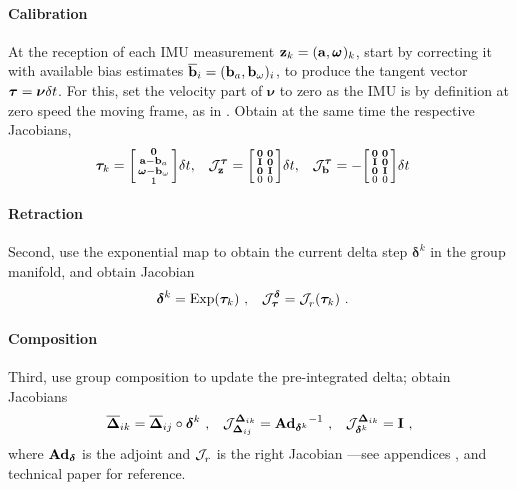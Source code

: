\paragraph{Calibration}
At the reception of each IMU measurement ${\bf z}_k=({\bf a},\prescript{}{}{\pmb{\omega}}_{})_k$, start by correcting it with available  bias estimates $\overline{{\bf b}}_i=({\bf b}_a,{\bf b}_{\omega})_i$, 
to produce the tangent vector ${\bm \tau}=\bm\nu\delta t$. For this, set the velocity part of $\bm\nu$ to zero as the IMU is by definition at zero speed \wrt 
the moving frame, as in . Obtain at the same time the respective Jacobians,
%
\begin{align}
    {\bm \tau}_k &= 
    \begin{bsmallmatrix}
    \bf0 \\ {\bf a} - {\bf b}_a \\ {{\bm \omega}} - {\bf b}_{\omega} \\ 1
    \end{bsmallmatrix}\delta t, 
    &
    {\mathcal{J}^{{\bm \tau}}_{{\bf z}}} &= 
    \begin{bsmallmatrix}
    \bf0 & \bf0 \\
    {\bf I} & \bf0 \\
    \bf0 & {\bf I} \\
    0 & 0
    \end{bsmallmatrix}\delta t,
    &
    {\mathcal{J}^{{\bm \tau}}_{{\bf b}}} &= 
    -\begin{bsmallmatrix}
    \bf0 & \bf0 \\
    {\bf I} & \bf0 \\
    \bf0 & {\bf I} \\
    0 & 0
    \end{bsmallmatrix}\delta t 
    \label{eq:preint_debiasing}
\end{align}
%
\paragraph{Retraction}
Second, use the exponential map  to obtain the current delta step $\bm\delta^k$ in the group manifold, and obtain Jacobian
%
\begin{align}
    \bm\delta^k &= \operatorname*{Exp}({\bm \tau}_{k})~,
    &
    {\mathcal{J}^{\bm\delta}_{{\bm \tau}}} &= {\mathcal{J}^{}_{r}}({\bm \tau}_k)
    ~.
\end{align}

\paragraph{Composition}
Third, use group composition  to update the pre-integrated delta; obtain Jacobians
%
\begin{align}
    \overline{{{\bm \Delta}}}_{ik} &= \overline{{{\bm \Delta}}}_{ij}\circ\bm\delta^k ~,
    &
    {\mathcal{J}^{{{\bm \Delta}}_{ik}}_{{{\bm \Delta}}_{ij}}} &= {\mathbf{Ad}_{\bm\delta^k}}^{-1}
    ~,&
    {\mathcal{J}^{{{\bm \Delta}}_{ik}}_{\bm\delta^k}} = {\bf I}
    \label{eq:pre_composition}
    ~,
\end{align}
%
where ${\mathbf{Ad}_{\bm\delta}}$ is the adjoint and ${\mathcal{J}^{}_{r}}$ is the right Jacobian ---see appendices ,  and technical paper \cite{sola2018micro} for reference. 

